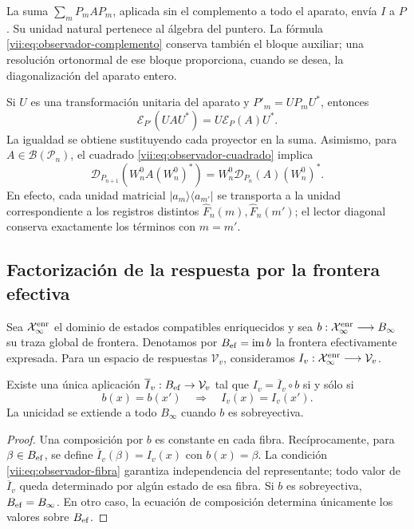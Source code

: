 La suma \(\sum_mP_mAP_m\), aplicada sin el complemento a todo el
aparato, envía \(I\) a \(P\). Su unidad natural pertenece al álgebra
del puntero. La fórmula \eqref{vii:eq:observador-complemento} conserva
también el bloque auxiliar; una resolución ortonormal de ese bloque
proporciona, cuando se desea, la diagonalización del aparato entero.

Si \(U\) es una transformación unitaria del aparato y
\(P'_m=UP_mU^*\), entonces
\[
 \mathcal E_{P'}(UAU^*)=U\mathcal E_P(A)U^*.
\]
La igualdad se obtiene sustituyendo cada proyector en la suma.
Asimismo, para \(A\in\mathcal B(\mathcal P_n)\), el cuadrado
\eqref{vii:eq:observador-cuadrado} implica
\[
 \mathcal D_{P_{n+1}}(W_n^0A(W_n^0)^*)
 =W_n^0\mathcal D_{P_n}(A)(W_n^0)^*.
\]
En efecto, cada unidad matricial \(|a_m\rangle\langle a_{m'}|\)
se transporta a la unidad correspondiente a los registros distintos
\(\widehat F_n(m),\widehat F_n(m')\); el lector diagonal conserva
exactamente los términos con \(m=m'\).

\subsection{Factorización de la respuesta por la frontera efectiva}
\label{vii:sec:observador-factorizacion}

Sea \(\mathcal X_\infty^{\rm enr}\) el dominio de estados compatibles
enriquecidos y sea
\(b:\mathcal X_\infty^{\rm enr}\longrightarrow B_\infty\) su traza
global de frontera. Denotamos por \(B_{\rm ef}=\operatorname{im}b\)
la frontera efectivamente expresada. Para un espacio de respuestas
\(\mathcal V_v\), consideramos
\(I_v:\mathcal X_\infty^{\rm enr}\longrightarrow\mathcal V_v\).

\begin{theorem}
\label{vii:thm:observador-factorizacion}
Existe una única aplicación \(\overline I_v:B_{\rm ef}\to\mathcal V_v\)
tal que \(I_v=\overline I_v\circ b\) si y sólo si
\begin{equation}
 b(x)=b(x')\quad\Longrightarrow\quad I_v(x)=I_v(x').
 \label{vii:eq:observador-fibra}
\end{equation}
La unicidad se extiende a todo \(B_\infty\) cuando \(b\) es
sobreyectiva.
\end{theorem}

\begin{proof}
Una composición por \(b\) es constante en cada fibra. Recíprocamente,
para \(\beta\in B_{\rm ef}\), se define
\(\overline I_v(\beta)=I_v(x)\) con \(b(x)=\beta\).
La condición \eqref{vii:eq:observador-fibra} garantiza independencia
del representante; todo valor de \(\overline I_v\) queda determinado
por algún estado de esa fibra. Si \(b\) es sobreyectiva,
\(B_{\rm ef}=B_\infty\). En otro caso, la ecuación de composición
determina únicamente los valores sobre \(B_{\rm ef}\).
\end{proof}

